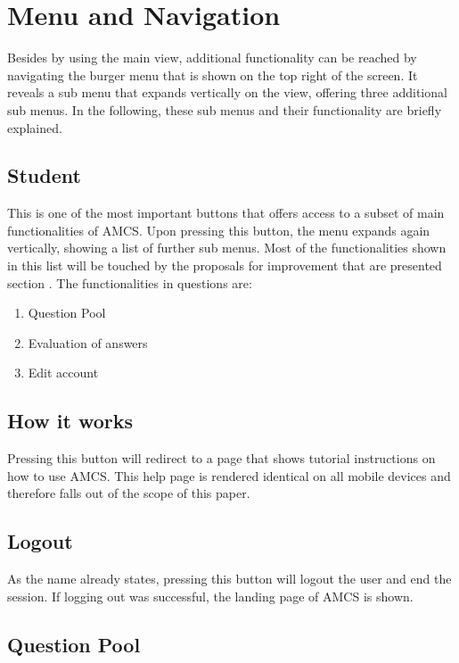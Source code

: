 \todogrf


\section{Menu and Navigation}
Besides by using the main view, additional functionality can be reached by navigating the burger menu that is shown on the top right of the screen. It reveals a sub menu that expands vertically on the view, offering three additional sub menus. In the following, these sub menus and their functionality are briefly explained.

\subsection{Student}

This is one of the most important buttons that offers access to a subset of main functionalities of AMCS. Upon pressing this button, the menu expands again vertically, showing a list of further sub menus. Most of the functionalities shown in this list will be touched by the proposals for improvement that are presented section \todosct. The functionalities in questions are:

\begin{enumerate}
	\item Question Pool
	\item Evaluation of answers
	\item Edit account
\end{enumerate}


\subsection{How it works}

Pressing this button will redirect to a page that shows tutorial instructions on how to use AMCS.
This help page is rendered identical on all mobile devices and therefore falls out of the scope of this paper.

\subsection{Logout}

As the name already states, pressing this button will logout the user and end the session. 
If logging out was successful, the landing page of AMCS is shown.



\subsection{Question Pool}


